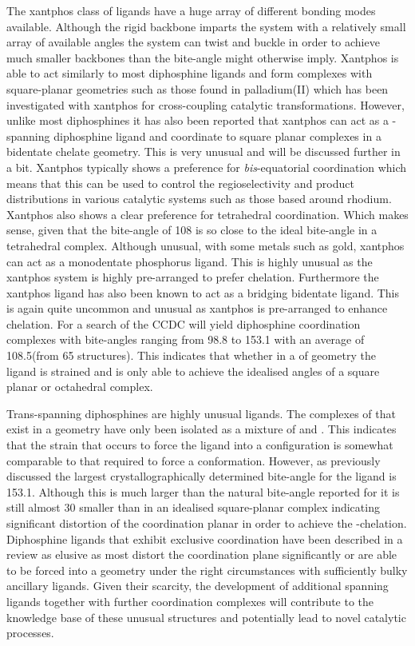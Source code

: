The xantphos class of ligands have a huge array of different bonding modes available.  Although the rigid backbone imparts the system with a relatively small array of available angles the system can twist and buckle in order to achieve much smaller backbones than the bite-angle might otherwise imply.  Xantphos is able to act similarly to most diphosphine ligands and form \cis{} complexes with square-planar geometries such as those found in palladium(II) which has been investigated with xantphos for cross-coupling catalytic transformations.  However, unlike most diphosphines it has also been reported that xantphos can act as a \trans-spanning diphosphine ligand and coordinate to square planar complexes in a \trans{} bidentate chelate geometry.  This is very unusual and will be discussed further in a bit.  Xantphos typically shows a preference for \emph{bis}-equatorial coordination which means that this can be used to control the regioselectivity and product distributions in various catalytic systems such as those based around rhodium.  Xantphos also shows a clear preference for tetrahedral coordination. Which makes sense, given that the bite-angle of 108\degrees{} is so close to the ideal bite-angle in a tetrahedral complex.  Although unusual, with some metals such as gold, xantphos can act as a monodentate phosphorus ligand.  This is highly unusual as the xantphos system is highly pre-arranged to prefer chelation.  Furthermore the xantphos ligand has also been known to act as a bridging bidentate ligand.  This is again quite uncommon and unusual as xantphos is pre-arranged to enhance chelation.  For \Phxantphos{} a search of the CCDC will yield diphosphine coordination complexes with bite-angles ranging from 98.8 to 153.1\degrees{} with an average of 108.5\degrees(from 65 structures).  This indicates that whether in a \cis{} of \trans{} geometry the ligand is strained and is only able to achieve the idealised angles of a square planar or octahedral complex.

Trans-spanning diphosphines are highly unusual ligands.  The complexes of \Phxantphos{} that exist in a \trans{} geometry have only been isolated as a mixture of \cis{} and \trans{}.  This indicates that the strain that occurs to force the ligand into a \trans{} configuration is somewhat comparable to that required to force a \cis{} conformation.  However, as previously discussed the largest crystallographically determined bite-angle for the \Phxantphos{} ligand is 153.1\degrees{}.  Although this is much larger than the natural bite-angle reported for \Phxantphos{} it is still almost 30\degrees{} smaller than in an idealised square-planar complex indicating significant distortion of the coordination planar in order to achieve the \trans{}-chelation.  Diphosphine ligands that exhibit exclusive \trans{} coordination have been described in a review as elusive as most distort the coordination plane significantly or are able to be forced into a \cis{} geometry under the right circumstances with sufficiently bulky ancillary ligands.  Given their scarcity, the development of additional \trans{} spanning ligands together with further coordination complexes will contribute to the knowledge base of these unusual structures and potentially lead to novel catalytic processes.  

